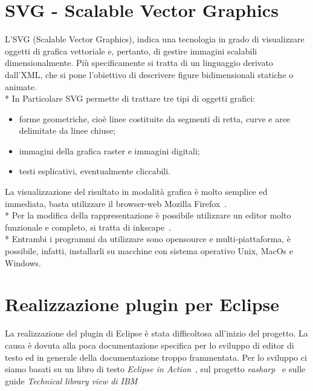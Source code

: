 \section{SVG - Scalable Vector Graphics} 
L'SVG (Scalable Vector Graphics), indica una tecnologia in grado di visualizzare oggetti 
di grafica vettoriale e, pertanto, di gestire immagini scalabili dimensionalmente.
Più specificamente si tratta di un linguaggio derivato dall'XML, che si pone l'obiettivo 
di descrivere figure bidimensionali statiche o animate. \\*
In Particolare SVG permette di trattare tre tipi di oggetti grafici:

\begin{itemize}
  \item forme geometriche, cioè linee costituite da segmenti di retta, curve e
  aree delimitate da linee chiuse;
  \item immagini della grafica raster e immagini digitali;
  \item testi esplicativi, eventualmente cliccabili.
\end{itemize} 
 
La visualizzazione del risultato in modalità grafica è molto semplice ed
immediata, basta utilizzare il browser-web Mozilla
Firefox~\cite{firefox_website:2}. \\*
Per la modifica della rappresentazione è possibile utilizzare un editor molto
funzionale e completo, si tratta di inkscape~\cite{Inkscape_website:3}. \\* 
Entrambi i programmi da utilizzare sono opensource e
multi-piattaforma, è possibile, infatti, installarli su macchine con sistema 
operativo Unix, MacOs e Windows.
     
      
\section{Realizzazione plugin per Eclipse} 

La realizzazione del plugin di Eclipse è stata difficoltosa all'inizio del
progetto. La causa è dovuta alla poca documentazione specifica per lo sviluppo
di editor di testo ed in generale della documentazione troppo frammentata.
Per lo sviluppo ci siamo basati su un libro di testo \emph{Eclipse in
Action}~\cite{eclipse_action:4}, sul progetto \emph{easharp}~\cite{esharp_website:5}
e sulle guide \emph{Technical library view di IBM}~\cite{ibm_website:6}


